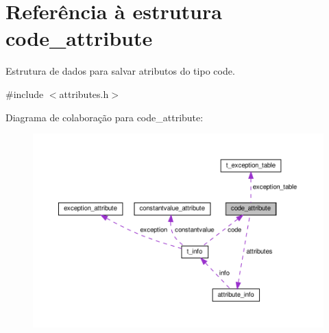 \hypertarget{structcode__attribute}{}\section{Referência à estrutura code\+\_\+attribute}
\label{structcode__attribute}


Estrutura de dados para salvar atributos do tipo code.  




{\ttfamily \#include $<$attributes.\+h$>$}



Diagrama de colaboração para code\+\_\+attribute\+:\nopagebreak
\begin{figure}[H]
\begin{center}
\leavevmode
\includegraphics[width=350pt]{structcode__attribute__coll__graph}
\end{center}
\end{figure}
